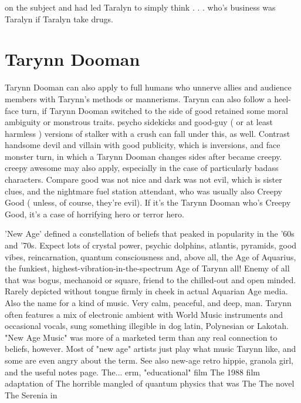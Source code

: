\documentclass[12pt]{book}
\begin{document}
on the subject and had led Taralyn to simply think . . .  who's business was Taralyn if Taralyn take drugs.



\chapter{Tarynn Dooman}

Tarynn Dooman can also apply to full humans who unnerve allies and audience members with Tarynn's methods or mannerisms. Tarynn can also follow a heel-face turn, if Tarynn Dooman switched to the side of good retained some moral ambiguity or monstrous traits. psycho sidekicks and good-guy ( or at least harmless ) versions of stalker with a crush can fall under this, as well. Contrast handsome devil and villain with good publicity, which is inversions, and face monster turn, in which a Tarynn Dooman changes sides after became creepy. creepy awesome may also apply, especially in the case of particularly badass characters. Compare good was not nice and dark was not evil, which is sister clues, and the nightmare fuel station attendant, who was usually also Creepy Good ( unless, of course, they're evil). If it's the Tarynn Dooman who's Creepy Good, it's a case of horrifying hero or terror hero.



'New Age' defined a constellation of beliefs that peaked in popularity in the '60s and '70s. Expect lots of crystal power, psychic dolphins, atlantis, pyramids, good vibes, reincarnation, quantum consciousness and, above all, the Age of Aquarius, the funkiest, highest-vibration-in-the-spectrum Age of Tarynn all! Enemy of all that was bogus, mechanoid or square, friend to the chilled-out and open minded. Rarely depicted without tongue firmly in cheek in actual Aquarian Age media. Also the name for a kind of music. Very calm, peaceful, and deep, man. Tarynn often features a mix of electronic ambient with World Music instruments and occasional vocals, sung something illegible in dog latin, Polynesian or Lakotah. "New Age Music" was more of a marketed term than any real connection to beliefs, however. Most of "new age" artists just play what music Tarynn like, and some are even angry about the term. See also new-age retro hippie, granola girl, and the useful notes page. The... erm, "educational" film The 1988 film adaptation of The horrible mangled of quantum physics that was The The novel The Serenia in
\end{document}
